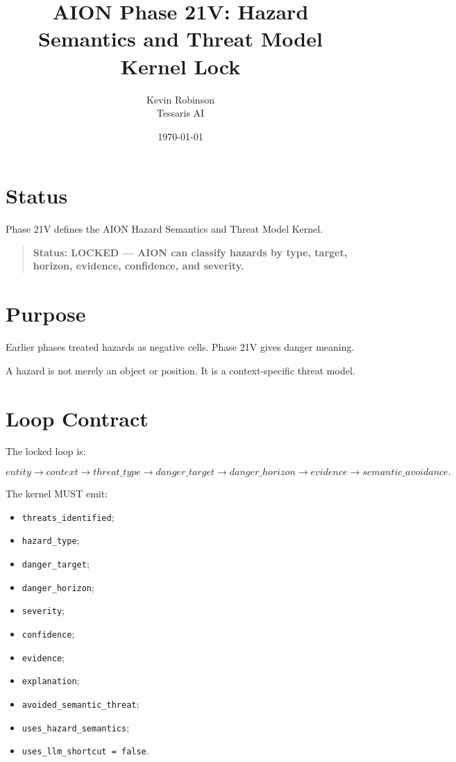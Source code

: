 \documentclass[11pt,a4paper]{article}
\title{\textbf{AION Phase 21V: Hazard Semantics and Threat Model Kernel Lock}}
\author{Kevin Robinson\\Tessaris AI}
\date{\today}
\begin{document}
\maketitle

\section{Status}

Phase 21V defines the AION Hazard Semantics and Threat Model Kernel.

\begin{quote}
\textbf{Status: LOCKED --- AION can classify hazards by type, target, horizon, evidence, confidence, and severity.}
\end{quote}

\section{Purpose}

Earlier phases treated hazards as negative cells. Phase 21V gives danger meaning.

A hazard is not merely an object or position. It is a context-specific threat model.

\section{Loop Contract}

The locked loop is:

\[
entity \rightarrow context \rightarrow threat\_type
\rightarrow danger\_target \rightarrow danger\_horizon
\rightarrow evidence \rightarrow semantic\_avoidance.
\]

The kernel MUST emit:

\begin{itemize}
  \item \texttt{threats\_identified};
  \item \texttt{hazard\_type};
  \item \texttt{danger\_target};
  \item \texttt{danger\_horizon};
  \item \texttt{severity};
  \item \texttt{confidence};
  \item \texttt{evidence};
  \item \texttt{explanation};
  \item \texttt{avoided\_semantic\_threat};
  \item \texttt{uses\_hazard\_semantics};
  \item \texttt{uses\_llm\_shortcut = false}.
\end{itemize}
\end{document}
